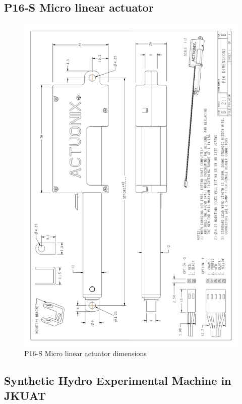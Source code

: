 \subsection{P16-S Micro linear actuator}
\begin{figure}[H]
    \centering
    \includegraphics[width=\textwidth,height=.9\textheight]{Figures/Actuonix-P16-Datasheet-1.png}
    \caption{P16-S Micro linear actuator dimensions}
\end{figure}



\subsection{Synthetic Hydro Experimental Machine in JKUAT}

